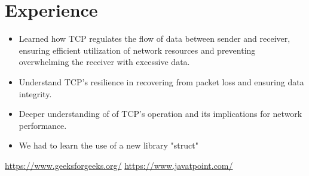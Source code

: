 \documentclass[11pt]{article}
\begin{document}
\section{Experience}
    \begin{itemize}
        \item Learned how TCP regulates the flow of data between sender and receiver, ensuring efficient utilization of network resources and preventing overwhelming the receiver with excessive data.
        \item Understand TCP's resilience in recovering from packet loss and ensuring data integrity.
        \item Deeper understanding of of TCP's operation and its implications for network performance.
        \item We had to learn the use of a new library "struct"
    \end{itemize}
\begin{thebibliography}{1}
     \url{https://www.geeksforgeeks.org/}
     \url{https://www.javatpoint.com/}
\end{thebibliography}
\end{document}
